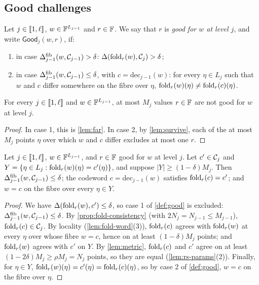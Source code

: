 \subsection{Good challenges}\label{sec:sound:good}

\begin{definition}\label{def:good}
Let $j \in \llbracket 1, \ell \rrbracket$, $w \in \mathbb{F}^{L_{j-1}}$ and $r \in \mathbb{F}$. We say that $r$ is \emph{good for $w$ at level $j$}, and write $\mathsf{Good}_j(w,r)$, if:
\begin{enumerate}
  \item in case $\Delta^{\mathrm{fib}}_{j-1}(w, \mathcal{C}_{j-1}) > \delta$: $\Delta(\mathrm{fold}_r(w), \mathcal{C}_{j}) > \delta$;
  \item in case $\Delta^{\mathrm{fib}}_{j-1}(w, \mathcal{C}_{j-1}) \le \delta$, with $c = \mathrm{dec}_{j-1}(w)$: for every $\eta \in L_j$ such that $w$ and $c$ differ somewhere on the fibre over $\eta$, $\mathrm{fold}_r(w)(\eta) \ne \mathrm{fold}_r(c)(\eta)$.
\end{enumerate}
\end{definition}

\begin{lemma}\label{lem:good}
For every $j \in \llbracket 1, \ell \rrbracket$ and $w \in \mathbb{F}^{L_{j-1}}$, at most $M_j$ values $r \in \mathbb{F}$ are not good for $w$ at level $j$.
\end{lemma}

\begin{proof}
In case 1, this is \cref{lem:far}. In case 2, by \cref{lem:survive}, each of the at most $M_j$ points $\eta$ over which $w$ and $c$ differ excludes at most one $r$.
\end{proof}

\begin{lemma}\label{lem:step}
Let $j \in \llbracket 1, \ell \rrbracket$, $w \in \mathbb{F}^{L_{j-1}}$, and $r \in \mathbb{F}$ good for $w$ at level $j$.
Let $c' \in \mathcal{C}_j$ and $Y = \{\eta \in L_j : \mathrm{fold}_r(w)(\eta) = c'(\eta)\}$, and suppose $|Y| \ge (1-\delta) M_j$.
Then $\Delta^{\mathrm{fib}}_{j-1}(w, \mathcal{C}_{j-1}) \le \delta$; the codeword $c = \mathrm{dec}_{j-1}(w)$ satisfies $\mathrm{fold}_r(c) = c'$; and $w = c$ on the fibre over every $\eta \in Y$.
\end{lemma}

\begin{proof}
We have $\Delta(\mathrm{fold}_r(w), c') \le \delta$, so case 1 of \cref{def:good} is excluded: $\Delta^{\mathrm{fib}}_{j-1}(w, \mathcal{C}_{j-1}) \le \delta$.
By \cref{prop:fold-consistency} (with $2N_j = N_{j-1} \le M_{j-1}$), $\mathrm{fold}_r(c) \in \mathcal{C}_j$.
By locality (\cref{lem:fold-word}(3)), $\mathrm{fold}_r(c)$ agrees with $\mathrm{fold}_r(w)$ at every $\eta$ over whose fibre $w = c$, hence on at least $(1-\delta)M_j$ points; and $\mathrm{fold}_r(w)$ agrees with $c'$ on $Y$.
By \cref{lem:metric}, $\mathrm{fold}_r(c)$ and $c'$ agree on at least $(1-2\delta)M_j \ge \rho M_j = N_j$ points, so they are equal (\cref{lem:rs-params}(2)).
Finally, for $\eta \in Y$, $\mathrm{fold}_r(w)(\eta) = c'(\eta) = \mathrm{fold}_r(c)(\eta)$, so by case 2 of \cref{def:good}, $w = c$ on the fibre over $\eta$.
\end{proof}

